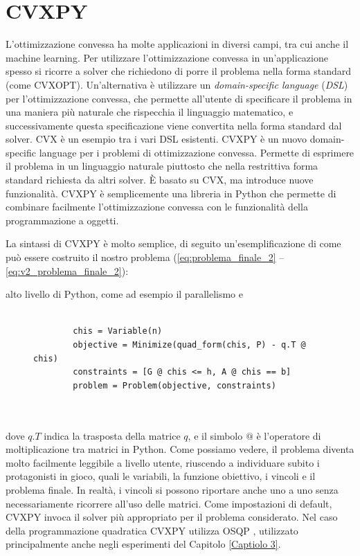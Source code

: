 \documentclass[a4paper,12pt]{report}
\begin{document}
\section{CVXPY}
L'ottimizzazione convessa ha molte applicazioni in diversi campi, tra cui anche il machine learning. Per utilizzare l'ottimizzazione convessa in un'applicazione spesso si ricorre a solver che richiedono di porre il problema nella forma standard (come CVXOPT). Un'alternativa è utilizzare un \textit{domain-specific language} (\textit{DSL}) per l'ottimizzazione convessa, che permette all'utente di specificare il problema in una maniera più naturale che rispecchia il linguaggio matematico, e successivamente questa specificazione viene convertita nella forma standard dal solver. CVX \cite{cvx} è un esempio tra i vari DSL esistenti.
CVXPY \cite{CVXPY_1} \cite{CVXPY_2} è un nuovo domain-specific language per i problemi di ottimizzazione convessa. Permette di esprimere il problema in un linguaggio naturale piuttosto che nella restrittiva forma standard richiesta da altri solver. \`E basato su CVX, ma introduce nuove funzionalità. CVXPY è semplicemente una libreria in Python che permette di combinare facilmente l'ottimizzazione convessa con le funzionalità della programmazione a oggetti.

La sintassi di CVXPY è molto semplice, di seguito un'esemplificazione di come può essere costruito il nostro problema (\ref{eq:problema_finale_2} -- \ref{eq:v2_problema_finale_2}):

alto livello di Python, come ad esempio il parallelismo e\begin{figure}[H]
    \begin{verbatim}

        chis = Variable(n)
        objective = Minimize(quad_form(chis, P) - q.T @ chis)
        constraints = [G @ chis <= h, A @ chis == b]
        problem = Problem(objective, constraints)
        
        
    \end{verbatim}
\end{figure}

\noindent dove $q.T$ indica la trasposta della matrice $q$, e il simbolo $@$ è l'operatore di moltiplicazione tra matrici in Python. Come possiamo vedere, il problema diventa molto facilmente leggibile a livello utente, riuscendo a individuare subito i protagonisti in gioco, quali le variabili, la funzione obiettivo, i vincoli e il problema finale. In realtà, i vincoli si possono riportare anche uno a uno senza necessariamente ricorrere all'uso delle matrici.
Come impostazioni di default, CVXPY invoca il solver più appropriato per il problema considerato. Nel caso della programmazione quadratica CVXPY utilizza OSQP \cite{osqp}, utilizzato principalmente anche negli esperimenti del Capitolo \ref{Captiolo 3}.
\end{document}
